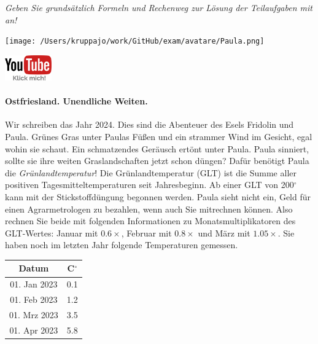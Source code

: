 \documentclass[a4paper, 9pt]{scrartcl}\usepackage[]{graphicx}\usepackage[]{xcolor}
\begin{document}
\textit{Geben Sie grundsätzlich Formeln und Rechenweg zur Lösung der Teilaufgaben mit an!} \\[1Ex]
 

 
\begin{minipage}[t]{0.5\textwidth}
\texttt{[image: /Users/kruppajo/work/GitHub/exam/avatare/Paula.png]}
\end{minipage}
\begin{minipage}[t]{0.5\textwidth}
\hfill
\href{https://youtu.be/fiWGgCX-cE4}{\includegraphics[width = 2cm]{img/youtube}}
\end{minipage}






\paragraph{Ostfriesland. Unendliche Weiten.}



Wir schreiben das Jahr 2024. Dies sind die Abenteuer des Esels Fridolin und Paula. Grünes Gras unter Paulas Füßen und ein strammer Wind im Gesicht, egal wohin sie schaut. Ein schmatzendes Geräusch ertönt unter Paula. Paula sinniert, sollte sie ihre weiten Graslandschaften jetzt schon düngen? Dafür benötigt Paula die \textit{Grünlandtemperatur}! Die Grünlandtemperatur (GLT) ist die Summe aller positiven Tagesmitteltemperaturen seit Jahresbeginn. Ab einer GLT von 200$^\circ$ kann mit der Stickstoffdüngung begonnen werden. Paula sieht nicht ein, Geld für einen Agrarmetrologen zu bezahlen, wenn auch Sie mitrechnen können. Also rechnen Sie beide mit folgenden Informationen zu Monatsmultiplikatoren des GLT-Wertes: Januar mit $0.6\times$, Februar mit $0.8\times$ und März mit
$1.05\times$. Sie haben noch im letzten Jahr folgende Temperaturen gemessen.

\begin{center}
\begin{tabular}{cc}
  \toprule
  Datum & C$^\circ$ \\
  \midrule
  01. Jan 2023 & 0.1\\
  01. Feb 2023 & 1.2\\
  01. Mrz 2023 & 3.5\\
  01. Apr 2023 & 5.8\\
  \bottomrule
\end{tabular}
\end{center}
\end{document}
